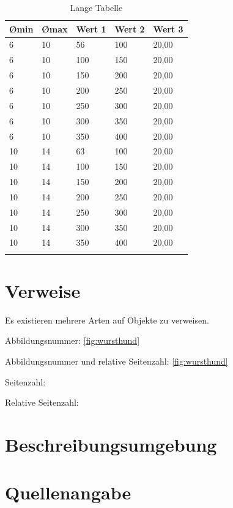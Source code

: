 \begin{longtable}{|p{2cm} | p{2cm} | p{2cm} | p{2cm} | p{2cm} |}
\hline
\textbf{\O min}& \textbf{\O max}& \textbf{Wert 1}& \textbf{Wert 2}& \textbf{Wert 3}\\
\hline
6& 10& 56& 100& 20,00\\
\hline
6& 10& 100& 150& 20,00\\
\hline
6& 10& 150& 200& 20,00\\
\hline
6& 10& 200& 250& 20,00\\
\hline
6& 10& 250& 300& 20,00\\
\hline
6& 10& 300& 350& 20,00\\
\hline
6& 10& 350& 400& 20,00\\
\hline
10& 14& 63& 100& 20,00\\
\hline
10& 14& 100& 150& 20,00\\
\hline
10& 14& 150& 200& 20,00\\
\hline
10& 14& 200& 250& 20,00\\
\hline
10& 14& 250& 300& 20,00\\
\hline
10& 14& 300& 350& 20,00\\
\hline
10& 14& 350& 400& 20,00\\
\hline
\caption{Lange Tabelle}
\label{tab:lange-tabelle}
\end{longtable}

\section{Verweise}

Es existieren mehrere Arten auf Objekte zu verweisen.

Abbildungsnummer: \ref{fig:wursthund}

Abbildungsnummer und relative Seitenzahl: \vref{fig:wursthund}

Seitenzahl: \pageref{fig:wursthund}

Relative Seitenzahl: 

\section{Beschreibungsumgebung}

\section{Quellenangabe}